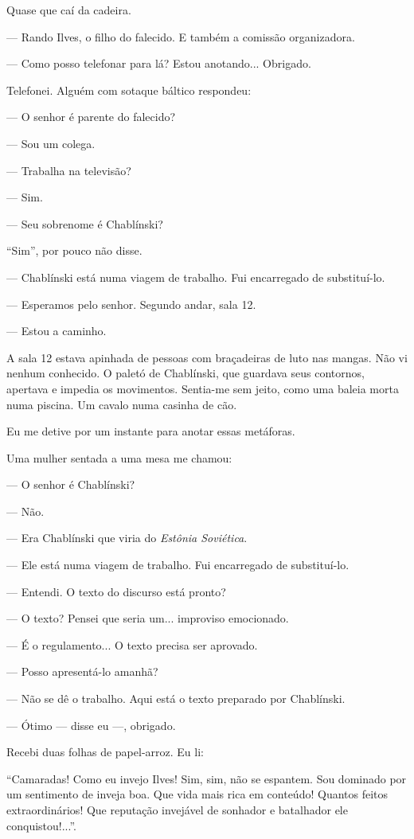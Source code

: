 Quase que caí da cadeira.

--- Rando Ilves, o filho do falecido. E também a comissão organizadora.

--- Como posso telefonar para lá? Estou anotando... Obrigado.

Telefonei. Alguém com sotaque báltico respondeu:

--- O senhor é parente do falecido?

--- Sou um colega.

--- Trabalha na televisão?

--- Sim.

--- Seu sobrenome é Chablínski?

``Sim'', por pouco não disse.

--- Chablínski está numa viagem de trabalho. Fui encarregado de
substituí-lo.

--- Esperamos pelo senhor. Segundo andar, sala 12.

--- Estou a caminho.

A sala 12 estava apinhada de pessoas com braçadeiras de luto nas mangas.
Não vi nenhum conhecido. O paletó de Chablínski, que guardava seus
contornos, apertava e impedia os movimentos. Sentia-me sem jeito, como
uma baleia morta numa piscina. Um cavalo numa casinha de cão.

Eu me detive por um instante para anotar essas metáforas.

Uma mulher sentada a uma mesa me chamou:

--- O senhor é Chablínski?

--- Não.

--- Era Chablínski que viria do \emph{Estônia Soviética}.

--- Ele está numa viagem de trabalho. Fui encarregado de substituí-lo.

--- Entendi. O texto do discurso está pronto?

--- O texto? Pensei que seria um... improviso emocionado.

--- É o regulamento... O texto precisa ser aprovado.

--- Posso apresentá-lo amanhã?

--- Não se dê o trabalho. Aqui está o texto preparado por Chablínski.

--- Ótimo --- disse eu ---, obrigado.

Recebi duas folhas de papel-arroz. Eu li:

``Camaradas! Como eu invejo Ilves! Sim, sim, não se espantem. Sou
dominado por um sentimento de inveja boa. Que vida mais rica em
conteúdo! Quantos feitos extraordinários! Que reputação invejável de
sonhador e batalhador ele conquistou!...''.

